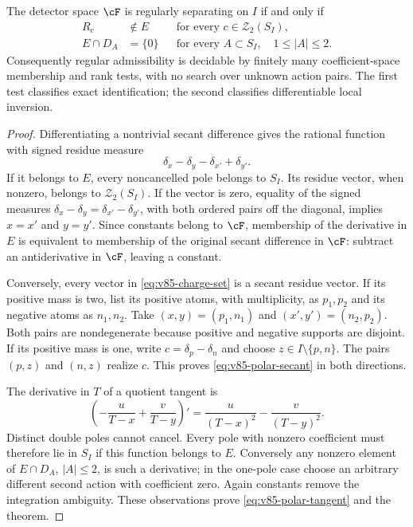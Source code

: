 \begin{theorem}\label{thm:v85-polar}
The detector space $\cF$ is regularly separating on $I$ if and only if
\begin{align}
 R_c&\notin E &&\text{for every }c\in\mathcal Z_2(S_I),
                                      \label{eq:v85-polar-secant}\\
 E\cap D_A&=\{0\} &&\text{for every }A\subset S_I,
                          \quad 1\le |A|\le2.\label{eq:v85-polar-tangent}
\end{align}
Consequently regular admissibility is decidable by finitely many
coefficient-space membership and rank tests, with no search over
unknown action pairs. The first test classifies exact identification;
the second classifies differentiable local inversion.
\end{theorem}
\begin{proof}
Differentiating a nontrivial secant difference gives the rational
function with signed residue measure
\[
             \delta_x-\delta_y-\delta_{x'}+\delta_{y'}.
\]
If it belongs to $E$, every noncancelled pole belongs to $S_I$.
Its residue vector, when nonzero, belongs to
$\mathcal Z_2(S_I)$. If the vector is zero, equality of the signed
measures $\delta_x-\delta_y=\delta_{x'}-\delta_{y'}$, with both
ordered pairs off the diagonal, implies $x=x'$ and $y=y'$.
Since constants belong to $\cF$, membership of the derivative in $E$
is equivalent to membership of the original secant difference in
$\cF$: subtract an antiderivative in $\cF$, leaving a constant.

Conversely, every vector in \eqref{eq:v85-charge-set} is a secant
residue vector. If its positive mass is two, list its positive atoms,
with multiplicity, as $p_1,p_2$ and its negative atoms as $n_1,n_2$.
Take $(x,y)=(p_1,n_1)$ and $(x',y')=(n_2,p_2)$. Both pairs are
nondegenerate because positive and negative supports are disjoint.
If its positive mass is one, write $c=\delta_p-\delta_n$ and choose
$z\in I\setminus\{p,n\}$. The pairs $(p,z)$ and $(n,z)$ realize
$c$. This proves \eqref{eq:v85-polar-secant} in both directions.

The derivative in $T$ of a quotient tangent is
\[
       \left(-\frac{u}{T-x}+\frac{v}{T-y}\right)'
                 =\frac{u}{(T-x)^2}-\frac{v}{(T-y)^2}.
\]
Distinct double poles cannot cancel. Every pole with nonzero
coefficient must therefore lie in $S_I$ if this function belongs to
$E$. Conversely any nonzero element of $E\cap D_A$, $|A|\le2$, is
such a derivative; in the one-pole case choose an arbitrary different
second action with coefficient zero. Again constants remove the
integration ambiguity. These observations prove
\eqref{eq:v85-polar-tangent} and the theorem.
\end{proof}

